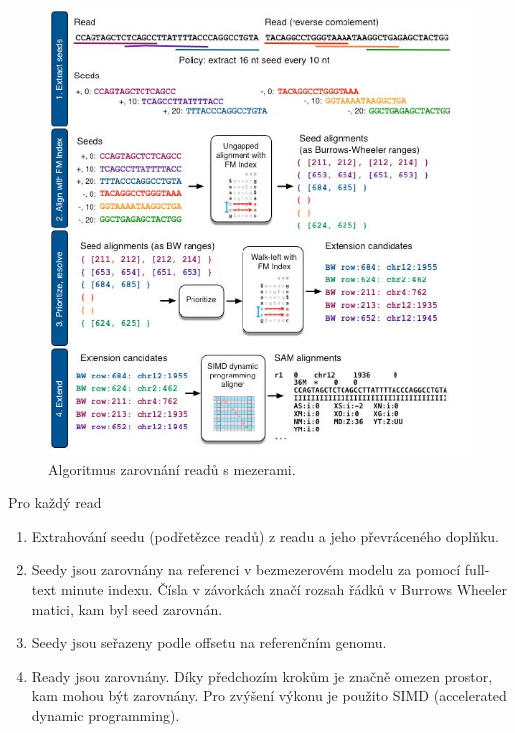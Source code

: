 \documentclass[czech,DP]{thesiskiv}
\numberwithin{equation}{section}
\begin{document}
\begin{figure}[H]		
		\centering
		\includegraphics[width=1\textwidth]{./img/bowtie2_postup.png}
		\caption{Algoritmus zarovnání readů s mezerami. \cite{bowtie2}}
		\label{fig:bowtie_postup}
\end{figure}


\noindent
Pro každý read
\begin{enumerate}
	\item Extrahování seedu (podřetězce readů) z readu a jeho převráceného doplňku. 
	\item Seedy jsou zarovnány na referenci v bezmezerovém modelu za pomocí full-text minute indexu. Čísla v závorkách značí rozsah řádků v Burrows Wheeler matici, kam byl seed zarovnán.
	\item Seedy jsou seřazeny podle offsetu na referenčním genomu. 
	\item Ready jsou zarovnány. Díky předchozím krokům je značně omezen prostor, kam mohou být zarovnány. Pro zvýšení výkonu je použito SIMD (accelerated dynamic programming).
\end{enumerate}
  
\end{document}
